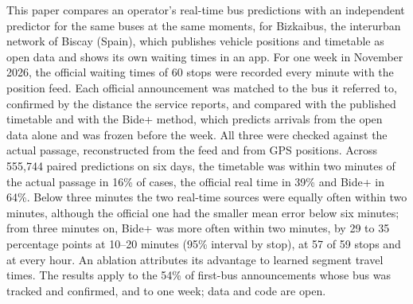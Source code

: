 This paper compares an operator's real-time bus predictions with an independent predictor for the same buses at the same
moments, for Bizkaibus, the interurban network of Biscay (Spain), which publishes vehicle positions and timetable
as open data and shows its own waiting times in an app. For one week in November 2026, the official waiting times
of 60 stops were recorded every minute with the position feed. Each official announcement was matched to the bus
it referred to, confirmed by the distance the service reports, and compared with the published timetable and with the
Bide+ method, which predicts arrivals from the open data alone and was frozen before the week. All three were checked
against the actual passage, reconstructed from the feed and from GPS positions. Across 555,744 paired
predictions on six days, the timetable was within two minutes of the actual passage in 16\% of cases, the official
real time in 39\% and Bide+ in 64\%. Below three minutes the two real-time sources were equally often within two minutes,
although the official one had the smaller mean error below six minutes; from three minutes on, Bide+ was more often
within two minutes, by 29 to 35 percentage points at 10--20 minutes (95\% interval by stop), at 57 of 59 stops and at
every hour. An ablation attributes its advantage to learned segment travel times. The results apply to the 54\% of
first-bus announcements whose bus was tracked and confirmed, and to one week; data and code are open.
